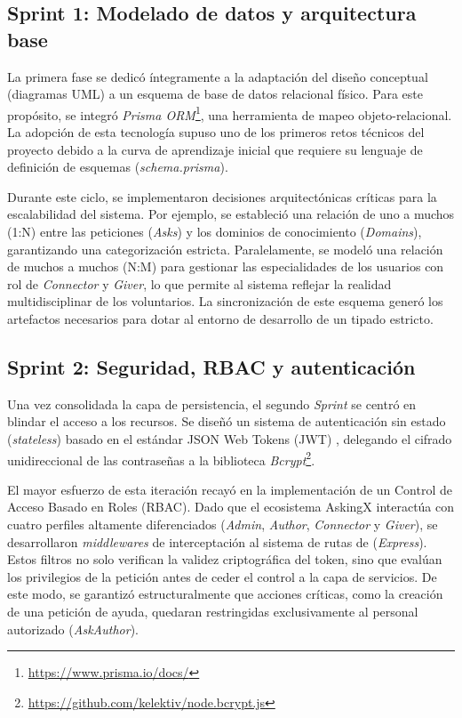\documentclass[11pt,oneside,spanish,listoffigures,listoftables]{tfgetsinf}
\begin{document}
\subsection{Sprint 1: Modelado de datos y arquitectura base}
La primera fase se dedicó íntegramente a la adaptación del diseño conceptual (diagramas UML) a un esquema de base de datos relacional físico. Para este propósito, se integró \textit{Prisma ORM}\footnote{\url{https://www.prisma.io/docs/}}, una herramienta de mapeo objeto-relacional. La adopción de esta tecnología supuso uno de los primeros retos técnicos del proyecto debido a la curva de aprendizaje inicial que requiere su lenguaje de definición de esquemas (\textit{schema.prisma}). 

Durante este ciclo, se implementaron decisiones arquitectónicas críticas para la escalabilidad del sistema. Por ejemplo, se estableció una relación de uno a muchos (1:N) entre las peticiones (\textit{Asks}) y los dominios de conocimiento (\textit{Domains}), garantizando una categorización estricta. Paralelamente, se modeló una relación de muchos a muchos (N:M) para gestionar las especialidades de los usuarios con rol de \textit{Connector} y \textit{Giver}, lo que permite al sistema reflejar la realidad multidisciplinar de los voluntarios. La sincronización de este esquema generó los artefactos necesarios para dotar al entorno de desarrollo de un tipado estricto.

\subsection{Sprint 2: Seguridad, RBAC y autenticación}
Una vez consolidada la capa de persistencia, el segundo \textit{Sprint} se centró en blindar el acceso a los recursos. Se diseñó un sistema de autenticación sin estado (\textit{stateless}) basado en el estándar JSON Web Tokens (JWT) \cite{jwt_rfc}, delegando el cifrado unidireccional de las contraseñas a la biblioteca \textit{Bcrypt}\footnote{\url{https://github.com/kelektiv/node.bcrypt.js}}.

El mayor esfuerzo de esta iteración recayó en la implementación de un Control de Acceso Basado en Roles (RBAC). Dado que el ecosistema AskingX interactúa con cuatro perfiles altamente diferenciados (\textit{Admin}, \textit{Author}, \textit{Connector} y \textit{Giver}), se desarrollaron \textit{middlewares} de interceptación al sistema de rutas de (\textit{Express}). Estos filtros no solo verifican la validez criptográfica del token, sino que evalúan los privilegios de la petición antes de ceder el control a la capa de servicios. De este modo, se garantizó estructuralmente que acciones críticas, como la creación de una petición de ayuda, quedaran restringidas exclusivamente al personal autorizado (\textit{AskAuthor}).
\end{document}

